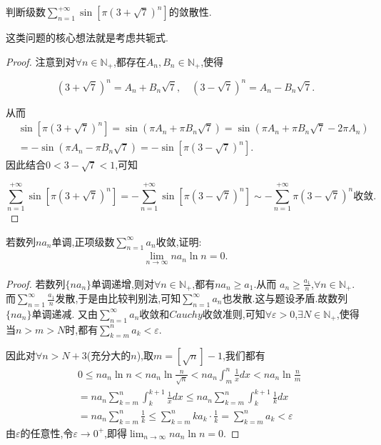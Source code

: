 \documentclass[lang=cn,newtx,10pt,scheme=chinese]{elegantbook}
\begin{document}
\begin{example}
  判断级数$\sum_{n=1}^{+\infty}{\sin \left[ \pi \left( 3+\sqrt{7} \right) ^n \right]}$的敛散性.
\end{example}
\begin{note}
  这类问题的核心想法就是考虑共轭式.
\end{note}
\begin{proof}
  注意到对\(\forall n \in \mathbb{N}_+\),都存在\(A_n,B_n \in \mathbb{N}_+\),使得

\[
(3 + \sqrt{7})^n = A_n + B_n\sqrt{7}, \quad (3 - \sqrt{7})^n = A_n - B_n\sqrt{7}.
\]

从而
\begin{align*}
&\sin[\pi(3 + \sqrt{7})^n] = \sin(\pi A_n + \pi B_n\sqrt{7})
= \sin(\pi A_n + \pi B_n\sqrt{7} - 2\pi A_n)\\
&= -\sin(\pi A_n - \pi B_n\sqrt{7})= -\sin[\pi(3 - \sqrt{7})^n].
\end{align*}
因此结合\(0 < 3 - \sqrt{7} < 1\),可知

\[
\sum_{n = 1}^{+\infty} \sin[\pi(3 + \sqrt{7})^n] = -\sum_{n = 1}^{+\infty} \sin[\pi(3 - \sqrt{7})^n] \sim -\sum_{n = 1}^{+\infty} \pi(3 - \sqrt{7})^n \text{收敛}.
\]
\end{proof}

\begin{example}
  若数列${na_n}$单调,正项级数$\sum_{n=1}^{\infty}{a_n}$收敛,证明:
  \begin{align*}
    \lim_{n\rightarrow \infty} na_n\ln n=0.
  \end{align*}
\end{example}
\begin{proof}
  若数列\(\{ na_n\}\)单调递增,则对\(\forall n \in \mathbb{N}_+\),都有\(na_n \geqslant a_1\).从而
\(a_n \geqslant \frac{a_1}{n}\),\(\forall n \in \mathbb{N}_+\).
而\(\sum_{n = 1}^{\infty}\frac{a_1}{n}\)发散,于是由比较判别法,可知\(\sum_{n = 1}^{\infty}a_n\)也发散.这与题设矛盾.故数列\(\{ na_n\}\)单调递减.
又由\(\sum_{n = 1}^{\infty}a_n\)收敛和\(Cauchy\)收敛准则,可知\(\forall \varepsilon > 0\),\(\exists N \in \mathbb{N}_+\),使得当\(n > m > N\)时,都有\(\sum_{k = m}^{n}a_k < \varepsilon\).

因此对\(\forall n > N + 3\)(充分大的\(n\)),取\(m = [\sqrt{n}] - 1\),我们都有
\begin{align*}
&0 \leqslant na_n\ln n < na_n\ln\frac{n}{\sqrt{n}} < na_n\int_{m}^{n}\frac{1}{x}dx<na_n\ln \frac{n}{m} \\
&= na_n\sum_{k = m}^{n}\int_{k}^{k + 1}\frac{1}{x}dx \leqslant na_n\sum_{k = m}^{n}\int_{k}^{k + 1}\frac{1}{k}dx\\
&= na_n\sum_{k = m}^{n}\frac{1}{k} \leqslant \sum_{k = m}^{n}ka_k\cdot\frac{1}{k} = \sum_{k = m}^{n}a_k < \varepsilon
\end{align*}
由\(\varepsilon\)的任意性,令\(\varepsilon \to 0^+\),即得\(\lim_{n \to \infty}na_n\ln n = 0\). 
\end{proof}
\end{document}
